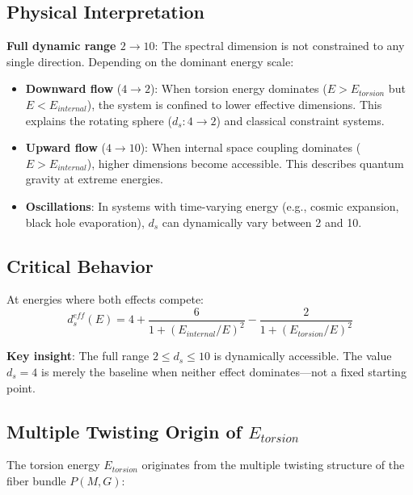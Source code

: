 \documentclass[12pt,a4paper]{article}
\begin{document}
\subsection{Physical Interpretation}

\textbf{Full dynamic range $2 \to 10$}: The spectral dimension is not constrained to any single direction. Depending on the dominant energy scale:

\begin{itemize}
    \item \textbf{Downward flow} ($4 \to 2$): When torsion energy dominates ($E > E_{torsion}$ but $E < E_{internal}$), the system is confined to lower effective dimensions. This explains the rotating sphere ($d_s: 4 \to 2$) and classical constraint systems.
    
    \item \textbf{Upward flow} ($4 \to 10$): When internal space coupling dominates ($E > E_{internal}$), higher dimensions become accessible. This describes quantum gravity at extreme energies.
    
    \item \textbf{Oscillations}: In systems with time-varying energy (e.g., cosmic expansion, black hole evaporation), $d_s$ can dynamically vary between 2 and 10.
\end{itemize}

\subsection{Critical Behavior}

At energies where both effects compete:
\begin{equation}
    d_s^{eff}(E) = 4 + \frac{6}{1+(E_{internal}/E)^2} - \frac{2}{1+(E_{torsion}/E)^2}
\end{equation}

\textbf{Key insight}: The full range $2 \leq d_s \leq 10$ is dynamically accessible. The value $d_s = 4$ is merely the baseline when neither effect dominates---not a fixed starting point.

\subsection{Multiple Twisting Origin of $E_{torsion}$}

The torsion energy $E_{torsion}$ originates from the multiple twisting structure of the fiber bundle $P(M, G)$:
\end{document}
